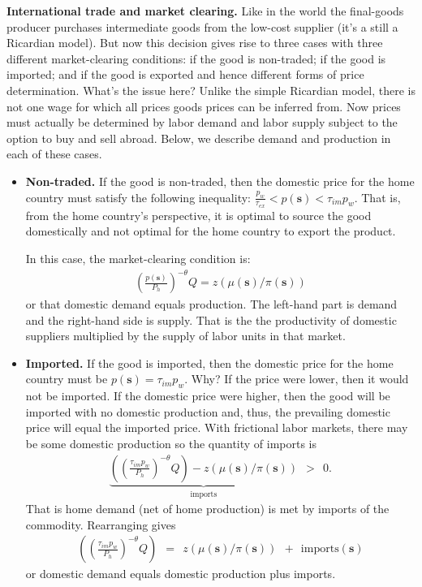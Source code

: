 \documentclass[pdftex,12pt]{article}
\begin{document}
\medskip
\noindent \textbf{International trade and market clearing.} Like in the \citet{eaton2002technology} world the final-goods producer purchases intermediate goods from the low-cost supplier (it's a still a Ricardian model). But now this decision gives rise to three cases with three different market-clearing conditions: if the good is non-traded; if the good is imported; and if the good is exported and hence different forms of price determination. What's the issue here? Unlike the simple Ricardian model, there is not one wage for which all prices goods prices can be inferred from. Now prices must actually be determined by labor demand and labor supply subject to the option to buy and sell abroad. Below, we describe demand and production in each of these cases.
\begin{itemize}
\item \textbf{Non-traded.} If the good is non-traded, then the domestic price for the home country must satisfy the following inequality: $\frac{p_w}{\tau_{ex}} < p(\textbf{s}) <  \tau_{im} p_w$. That is, from the home country's perspective, it is optimal to source the good domestically and not optimal for the home country to export the product.

    In this case, the market-clearing condition is:
    \begin{align}
\left(\frac{p(\textbf{s})}{P_h}\right)^{-\theta}Q=  z \left( \mu(\textbf{s}) / \pi(\textbf{s}) \right)
\label{eq:non_traded_mc_soe}
    \end{align}
    or that domestic demand equals production. The left-hand part is demand and the right-hand side is supply. That is the the productivity of domestic suppliers multiplied by the supply of labor units in that market.


\item \textbf{Imported.} If the good is imported, then the domestic price for the home country must be $p(\textbf{s}) =  \tau_{im} p_w$. Why? If the price were lower, then it would not be imported. If the domestic price were higher, then the good will be imported with no domestic production and, thus, the prevailing domestic price will equal the imported price. With frictional labor markets, there may be some domestic production so the quantity of imports is
    \begin{align}
 \underbrace{ \left(\left(\frac{\tau_{im} p_w}{P_h}\right)^{-\theta}Q \right) - z\left( \mu(\textbf{s}) / \pi(\textbf{s})\right)}_{\mbox{imports}} \ \ > \ \ 0.
\label{eq:imported_mc_soe}
    \end{align}
    That is home demand (net of home production) is met by imports of the commodity. Rearranging gives
 \begin{align}
 \left(\left(\frac{\tau_{im} p_w}{P_h}\right)^{-\theta}Q \right) \ \ = \ \ z\left( \mu(\textbf{s}) / \pi(\textbf{s})\right) \ \ + \ \  \mbox{imports}(\textbf{s})
\label{eq:imported_mc_soe_im}
 \end{align}
or domestic demand equals domestic production plus imports.



\end{itemize}
\end{document}

